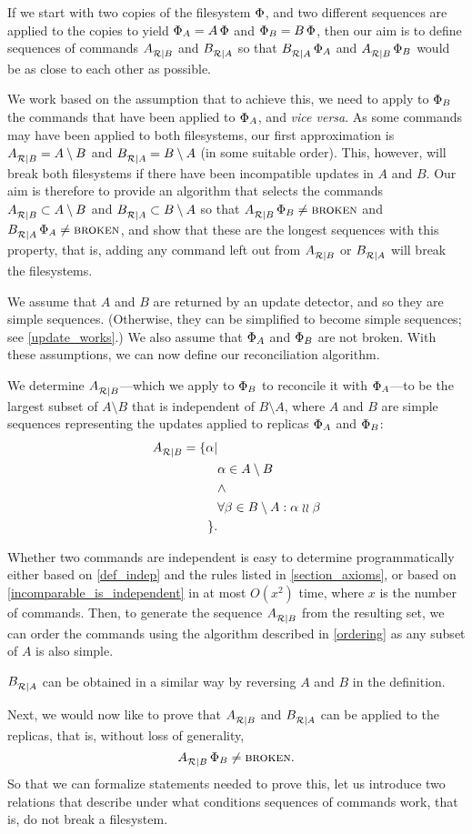 
If we start with two copies of the filesystem $\Phi$,
and two different sequences are applied to the copies to yield $\Phi_A=A\,\Phi$
and $\Phi_B=B\,\Phi$, then our aim is to define sequences of commands ${A}^{}_{\mathcal{R}|{B}}$ and ${B}^{}_{\mathcal{R}|{A}}$
so that ${B}^{}_{\mathcal{R}|{A}}\,\Phi_A$ and ${A}^{}_{\mathcal{R}|{B}}\,\Phi_B$ would be as close to each other as possible.

We work based on the assumption that to achieve this, we need
to apply to $\Phi_B$ the commands that have been applied to $\Phi_A$, and \emph{vice versa}.
As some commands may have been applied to both filesystems, our first approximation
is ${A}^{}_{\mathcal{R}|{B}} = A\setminus B$ and ${B}^{}_{\mathcal{R}|{A}} = B\setminus A$
(in some suitable order).
This, however, will break both filesystems if there have been incompatible updates
in $A$ and $B$. 
Our aim is therefore to provide an algorithm that selects the commands 
${A}^{}_{\mathcal{R}|{B}} \subset A\setminus B$
and ${B}^{}_{\mathcal{R}|{A}} \subset B\setminus A$ 
so that ${A}^{}_{\mathcal{R}|{B}}\,\Phi_B\neq\text{\normalfont\scshape{broken}}$ and ${B}^{}_{\mathcal{R}|{A}}\,\Phi_A\neq\text{\normalfont\scshape{broken}}$,
and show that these are the longest sequences with this property, that is,
adding any command left out from ${A}^{}_{\mathcal{R}|{B}}$ or ${B}^{}_{\mathcal{R}|{A}}$ will break the filesystems.

We assume that $A$ and $B$ are returned by an update detector,
and so they are simple sequences.
(Otherwise, they can be simplified to become simple sequences; see \cref{update_works}.)
We also assume that $\Phi_A$ and $\Phi_B$ are not broken.
With these assumptions,
we can now define our reconciliation algorithm.

\begin{mydef}[Reconciliation]\label{def:reconciliation}
We determine ${A}^{}_{\mathcal{R}|{B}}$---which we apply to $\Phi_B$ 
to reconcile it with $\Phi_A$---to be
the largest subset of $A\setminus B$
that is independent of $B\setminus A$,
where $A$ and $B$ are simple sequences representing
the updates applied to replicas $\Phi_A$ and $\Phi_B$:
\begin{align*}
{A}^{}_{\mathcal{R}|{B}} = \{\alpha|{}& \\
& \alpha\in A\setminus B \\
& \wedge \\
& \forall \beta\in B\setminus A: \alpha\mathrel{\wr\wr}\beta\\
\}. &
\end{align*}
\end{mydef}

Whether two commands are independent is easy to determine programmatically
either based on \cref{def_indep} and the rules listed in \cref{section_axioms},
or based on \cref{incomparable_is_independent} 
in at most $O(x^2)$ time, where $x$ is the number of commands.
Then, to generate the sequence ${A}^{}_{\mathcal{R}|{B}}$ from the resulting set, 
we can order the commands using the algorithm described in
\cref{ordering} as any subset of $A$ is also simple.

${B}^{}_{\mathcal{R}|{A}}$ can be obtained in a similar way by reversing $A$ and $B$
in the definition.

\bigskip

\noindent
Next, we would now like to prove that ${A}^{}_{\mathcal{R}|{B}}$ and ${B}^{}_{\mathcal{R}|{A}}$ can be applied to the replicas,
that is, without loss of generality,
\[ {A}^{}_{\mathcal{R}|{B}}\,\Phi_B\neq\text{\normalfont\scshape{broken}}. \]
So that we can formalize statements needed to prove this,
let us introduce two relations that describe under what conditions
sequences of commands work, that is, do not break a filesystem.

